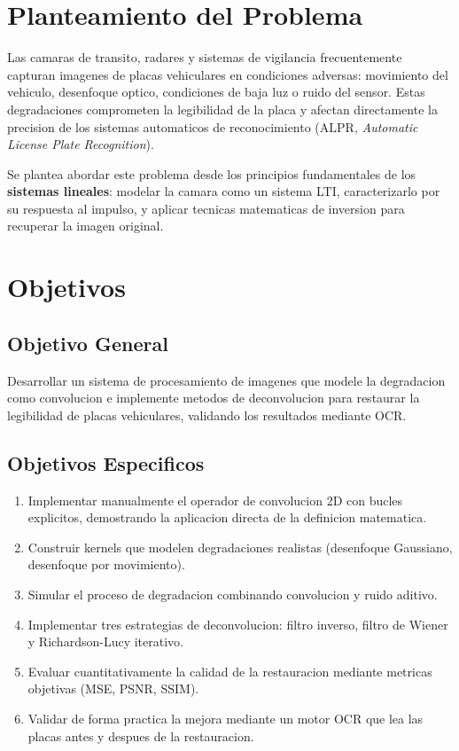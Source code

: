 \documentclass[11pt,a4paper]{article}
\begin{document}
\section{Planteamiento del Problema}

Las camaras de transito, radares y sistemas de vigilancia frecuentemente capturan imagenes de placas vehiculares en condiciones adversas: movimiento del vehiculo, desenfoque optico, condiciones de baja luz o ruido del sensor. Estas degradaciones comprometen la legibilidad de la placa y afectan directamente la precision de los sistemas automaticos de reconocimiento (ALPR, \textit{Automatic License Plate Recognition}).

Se plantea abordar este problema desde los principios fundamentales de los \textbf{sistemas lineales}: modelar la camara como un sistema LTI, caracterizarlo por su respuesta al impulso, y aplicar tecnicas matematicas de inversion para recuperar la imagen original.

\section{Objetivos}

\subsection{Objetivo General}
Desarrollar un sistema de procesamiento de imagenes que modele la degradacion como convolucion e implemente metodos de deconvolucion para restaurar la legibilidad de placas vehiculares, validando los resultados mediante OCR.

\subsection{Objetivos Especificos}
\begin{enumerate}[leftmargin=*]
    \item Implementar manualmente el operador de convolucion 2D con bucles explicitos, demostrando la aplicacion directa de la definicion matematica.
    \item Construir kernels que modelen degradaciones realistas (desenfoque Gaussiano, desenfoque por movimiento).
    \item Simular el proceso de degradacion combinando convolucion y ruido aditivo.
    \item Implementar tres estrategias de deconvolucion: filtro inverso, filtro de Wiener y Richardson-Lucy iterativo.
    \item Evaluar cuantitativamente la calidad de la restauracion mediante metricas objetivas (MSE, PSNR, SSIM).
    \item Validar de forma practica la mejora mediante un motor OCR que lea las placas antes y despues de la restauracion.
\end{enumerate}
\end{document}
